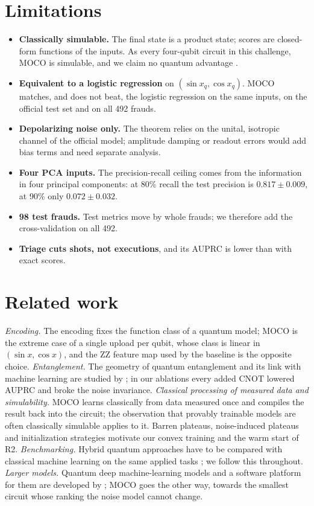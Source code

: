 \documentclass[10pt,twocolumn]{article}
\theoremstyle{definition}
\begin{document}
\section{Limitations}

\begin{itemize}
\item \textbf{Classically simulable.} The final state is a product state; scores are closed-form functions of the
inputs. As every four-qubit circuit in this challenge, MOCO is simulable, and we claim no quantum advantage
\citep{cerezo2023simulability}.
\item \textbf{Equivalent to a logistic regression} on $(\sin x_q,\cos x_q)$. MOCO matches, and does not beat, the
logistic regression on the same inputs, on the official test set and on all 492 frauds.
\item \textbf{Depolarizing noise only.} The theorem relies on the unital, isotropic channel of the official
model; amplitude damping or readout errors would add bias terms and need separate analysis.
\item \textbf{Four PCA inputs.} The precision-recall ceiling comes from the information in four principal
components: at 80\% recall the test precision is $0.817\pm0.009$, at 90\% only $0.072\pm0.032$.
\item \textbf{98 test frauds.} Test metrics move by whole frauds; we therefore add the cross-validation on all 492.
\item \textbf{Triage cuts shots, not executions}, and its AUPRC is lower than with exact scores.
\end{itemize}

\section{Related work}

\emph{Encoding.} The encoding fixes the function class of a quantum model; MOCO is the extreme case of a single
upload per qubit, whose class is linear in $(\sin x,\cos x)$, and the ZZ feature map used by the baseline is the
opposite choice. \emph{Entanglement.} The geometry of quantum entanglement and its link with machine learning are
studied by \citet{zuev2023}; in our ablations every added CNOT lowered AUPRC and broke the noise invariance.
\emph{Classical processing of measured data and simulability.} MOCO learns classically from data measured once
and compiles the result back into the circuit; the observation that provably trainable models are often
classically simulable \citep{cerezo2023simulability} applies to it. Barren plateaus, noise-induced plateaus and
initialization strategies motivate our convex training and the warm start of R2. \emph{Benchmarking.} Hybrid
quantum approaches have to be compared with classical machine learning on the same applied tasks
\citep{akhmed2023}; we follow this throughout. \emph{Larger models.} Quantum deep machine-learning models and a
software platform for them are developed by \citet{borovinsky2025}; MOCO goes the other way, towards the smallest
circuit whose ranking the noise model cannot change.
\end{document}
